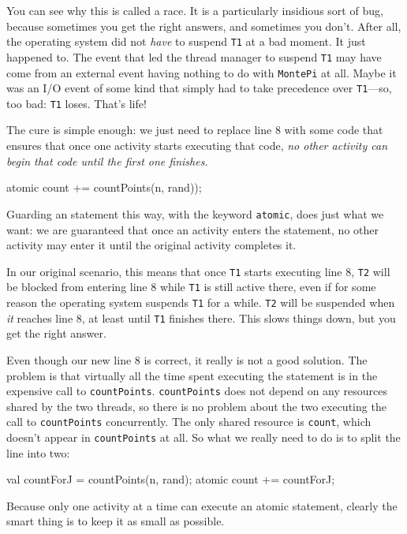 You can see why this is called a race. It is a particularly insidious sort of bug,
because sometimes you get the right answers, and sometimes you don't.
After all, the operating system did not {\em have} to suspend {\tt T1} at a
bad moment.  It just happened to.  The event that led the thread manager
to suspend {\tt T1} may have come from an external event having nothing to
do with {\tt MontePi} at all.  Maybe it was an I/O event of some kind
that simply had to take precedence over {\tt T1}---so, too bad: {\tt T1} loses.
That's life!

The cure is simple enough: we just need to replace line 8 with some code
that ensures that once one activity starts executing that code, {\em no other
activity can begin that code until the first one finishes.}
\begin{xtennum}[firstnumber=8]
atomic count += countPoints(n, rand));
\end{xtennum}
Guarding an \Xten{} statement this way, with the keyword {\tt atomic},
does just what we want: we are guaranteed that once an activity enters the
statement, no other activity may enter it until the original activity
completes it.

In our original scenario, this means that once {\tt T1}
starts executing line 8,  {\tt T2} will be blocked from entering
line 8 while {\tt T1} is still active there, even if for some reason the
operating system suspends {\tt T1} for a while.  {\tt T2} will be
suspended when {\em it} reaches line 8, at least until {\tt T1} finishes there.
This slows things down, but you get the right answer.

Even though our new line 8 is correct, it really is not a good solution.
The problem is that virtually all the time spent executing the statement is
in the expensive call to {\tt countPoints}.  {\tt countPoints}
does not depend on any resources shared by the two threads,
so there is no problem about the
two executing the call to {\tt countPoints} concurrently.
The only shared resource is {\tt count}, which
doesn't appear in {\tt countPoints} at all.  So what we really need
to do is to split the line into two:
\begin{xtennum}[firstnumber=8]
val countForJ =  countPoints(n, rand);
atomic count += countForJ;
\end{xtennum}
Because only one activity at a time can execute an atomic statement,
clearly the smart thing is to keep it as small as possible.


